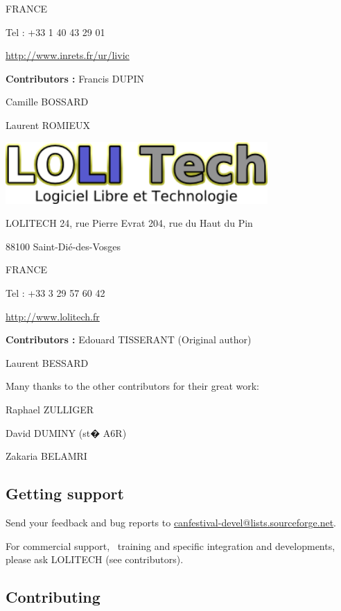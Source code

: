 \documentclass[12pt,english,a4paper]{book}
\begin{document}
FRANCE

Tel : +33 1 40 43 29 01

\href{http://www.inrets.fr/ur/livic}{http://www.inrets.fr/ur/livic}

\textbf{Contributors :} Francis DUPIN

Camille BOSSARD

Laurent ROMIEUX

\bigskip{}


\begin{center}
\includegraphics[width=10cm]{Pictures/100002010000013A0000004A96B0C1FF} 
\par\end{center}

LOLITECH
24, rue Pierre Evrat
204, rue du Haut du Pin

88100 Saint-Dié-des-Vosges

FRANCE

Tel : +33 3 29 57 60 42

\href{http://www.lolitech.fr/}{http://www.lolitech.fr}

\textbf{Contributors :} Edouard TISSERANT (Original author)

Laurent BESSARD

\bigskip{}


Many thanks to the other contributors for their great work:

Raphael ZULLIGER

David DUMINY (st� A6R)

Zakaria BELAMRI


\subsection{Getting support}

Send your feedback and bug reports to \href{mailto:canfestival-devel@lists.sourceforge.net}{canfestival-devel@lists.sourceforge.net}.

For commercial support, \ training and specific integration and developments,
please ask LOLITECH (see contributors).


\subsection{Contributing}
\end{document}

